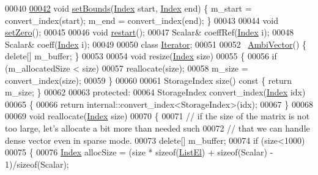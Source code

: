 \begin{DoxyCode}
00040 
\hyperlink{class_eigen_1_1internal_1_1_ambi_vector_a8a37e06682a29a63239d914de342096c}{00042}     \textcolor{keywordtype}{void} \hyperlink{class_eigen_1_1internal_1_1_ambi_vector_a8a37e06682a29a63239d914de342096c}{setBounds}(\hyperlink{namespace_eigen_a62e77e0933482dafde8fe197d9a2cfde}{Index} start, \hyperlink{namespace_eigen_a62e77e0933482dafde8fe197d9a2cfde}{Index} end) \{ m\_start = convert\_index(start); m\_end = 
      convert\_index(end); \}
00043 
00044     \textcolor{keywordtype}{void} \hyperlink{class_eigen_1_1internal_1_1_ambi_vector_af472b476758307bcc1621d9eb4018f6a}{setZero}();
00045 
00046     \textcolor{keywordtype}{void} \hyperlink{class_eigen_1_1internal_1_1_ambi_vector_a518fc22cdfa37e5340350e2a69fa8f1a}{restart}();
00047     Scalar& coeffRef(\hyperlink{namespace_eigen_a62e77e0933482dafde8fe197d9a2cfde}{Index} i);
00048     Scalar& coeff(\hyperlink{namespace_eigen_a62e77e0933482dafde8fe197d9a2cfde}{Index} i);
00049 
00050     \textcolor{keyword}{class }\hyperlink{class_eigen_1_1internal_1_1_ambi_vector_1_1_iterator}{Iterator};
00051 
00052     ~\hyperlink{class_eigen_1_1internal_1_1_ambi_vector}{AmbiVector}() \{ \textcolor{keyword}{delete}[] m\_buffer; \}
00053 
00054     \textcolor{keywordtype}{void} resize(\hyperlink{namespace_eigen_a62e77e0933482dafde8fe197d9a2cfde}{Index} size)
00055     \{
00056       \textcolor{keywordflow}{if} (m\_allocatedSize < size)
00057         reallocate(size);
00058       m\_size = convert\_index(size);
00059     \}
00060 
00061     StorageIndex size()\textcolor{keyword}{ const }\{ \textcolor{keywordflow}{return} m\_size; \}
00062 
00063   \textcolor{keyword}{protected}:
00064     StorageIndex convert\_index(\hyperlink{namespace_eigen_a62e77e0933482dafde8fe197d9a2cfde}{Index} idx)
00065     \{
00066       \textcolor{keywordflow}{return} internal::convert\_index<StorageIndex>(idx);
00067     \}
00068 
00069     \textcolor{keywordtype}{void} reallocate(\hyperlink{namespace_eigen_a62e77e0933482dafde8fe197d9a2cfde}{Index} size)
00070     \{
00071       \textcolor{comment}{// if the size of the matrix is not too large, let's allocate a bit more than needed such}
00072       \textcolor{comment}{// that we can handle dense vector even in sparse mode.}
00073       \textcolor{keyword}{delete}[] m\_buffer;
00074       \textcolor{keywordflow}{if} (size<1000)
00075       \{
00076         \hyperlink{namespace_eigen_a62e77e0933482dafde8fe197d9a2cfde}{Index} allocSize = (size * \textcolor{keyword}{sizeof}(\hyperlink{struct_eigen_1_1internal_1_1_ambi_vector_1_1_list_el}{ListEl}) + \textcolor{keyword}{sizeof}(Scalar) - 1)/\textcolor{keyword}{sizeof}(Scalar);

\end{DoxyCode}
